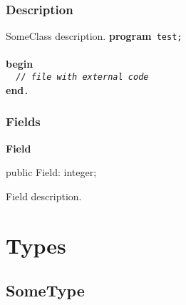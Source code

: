 \documentclass{report}
\newif\ifpdf
\begin{document}
\subsubsection*{\large{\textbf{Description}}\normalsize\hspace{1ex}\hfill}
SomeClass description. \texttt{}\textbf{program}\texttt{~test;\\\nopagebreak[3]
\\\nopagebreak[3]
}\textbf{begin}\texttt{\\\nopagebreak[3]
~~\textit{//~file~with~external~code}\\\nopagebreak[3]
}\textbf{end}\texttt{.\\
}\subsubsection*{\large{\textbf{Fields}}\normalsize\hspace{1ex}\hfill}
\begin{list}{}{
\setlength{\itemindent}{0cm}
\setlength{\listparindent}{0cm}
\setlength{\leftmargin}{\evensidemargin}
\addtolength{\leftmargin}{\tmplength}
\settowidth{\labelsep}{X}
\addtolength{\leftmargin}{\labelsep}
\setlength{\labelwidth}{\tmplength}
}
\label{main.SomeClass-Field}
\item[\textbf{Field}\hfill]
\ifpdf
\begin{flushleft}
\fi
\begin{ttfamily}
public Field: integer;\end{ttfamily}

\ifpdf
\end{flushleft}
\fi


\par Field description.\end{list}
\section{Types}
\ifpdf
\subsection*{\large{\textbf{SomeType}}\normalsize\hspace{1ex}\hrulefill}
\else
\end{document}
